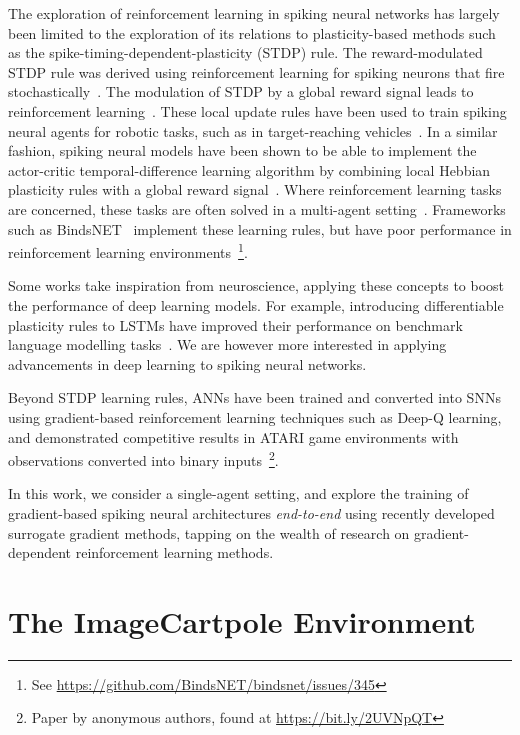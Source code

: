 \documentclass[fyp]{socreport}
\begin{document}
The exploration of reinforcement learning in spiking neural networks has largely
been limited to the exploration of its relations to plasticity-based methods
such as the spike-timing-dependent-plasticity (STDP) rule. The reward-modulated
STDP rule was derived using reinforcement learning for spiking neurons that fire
stochastically~\cite{florian2005}. The modulation of STDP by a global reward
signal leads to reinforcement
learning~\cite{florian07_reinf_learn_throug_modul_spike,baras07_reinf_learn_spike_time_depen}.
These local update rules have been used to train spiking neural agents for
robotic tasks, such as in target-reaching
vehicles~\cite{10.3389/fnbot.2019.00018}. In a similar fashion, spiking neural
models have been shown to be able to implement the actor-critic
temporal-difference learning algorithm by combining local Hebbian plasticity
rules with a global reward
signal~\cite{potjans09_spikin_neural_networ_model_actor}. Where reinforcement
learning tasks are concerned, these tasks are often solved in a multi-agent
setting~\cite{VITANZA20153122,aenugu19_reinf_learn_with_spikin_coagen}.
Frameworks such as BindsNET~\cite{10.3389/fninf.2018.00089} implement these
learning rules, but have poor performance in reinforcement learning
environments~\footnote{See
  \url{https://github.com/BindsNET/bindsnet/issues/345}}.

Some works take inspiration from neuroscience, applying these concepts to boost
the performance of deep learning models. For example, introducing differentiable
plasticity rules to LSTMs have improved their performance on benchmark language
modelling tasks~\cite{miconi2018backpropamine}. We are however more interested
in applying advancements in deep learning to spiking neural networks.

Beyond STDP learning rules, ANNs have been trained and converted into SNNs using
gradient-based reinforcement learning techniques such as Deep-Q learning, and
demonstrated competitive results in ATARI game environments with observations
converted into binary inputs~\footnote{Paper by anonymous authors, found at
  \url{https://bit.ly/2UVNpQT}}.

In this work, we consider a single-agent setting, and explore the training of
gradient-based spiking neural architectures \emph{end-to-end} using recently
developed surrogate gradient methods, tapping on the wealth of research on
gradient-dependent reinforcement learning methods.

\section{The ImageCartpole Environment}
\end{document}

